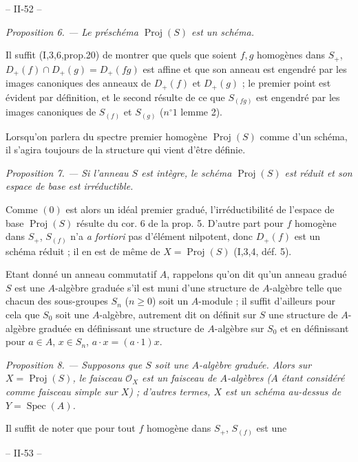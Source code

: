 \noindent -- II-52 --

\noindent \emph{Proposition 6. --- Le préschéma $\operatorname{Proj}(S)$ est un schéma.}

\noindent Il suffit (I,3,6,prop.20) de montrer que quels que soient $f,g$ homogènes dans $S_+$, $D_+(f) \cap D_+(g) = D_+(fg)$ est affine et que son anneau est engendré par les images canoniques des anneaux de $D_+(f)$ et $D_+(g)$ ; le premier point est évident par définition, et le second résulte de ce que $S_{(fg)}$ est engendré par les images canoniques de $S_{(f)}$ et $S_{(g)}$ ($n^\circ 1$ lemme 2).

\noindent Lorsqu'on parlera du spectre premier homogène $\operatorname{Proj}(S)$ comme d'un schéma, il s'agira toujours de la structure qui vient d'être définie.

\noindent \emph{Proposition 7. --- Si l'anneau $S$ est intègre, le schéma $\operatorname{Proj}(S)$ est réduit et son espace de base est irréductible.}

\noindent Comme $(0)$ est alors un idéal premier gradué, l'irréductibilité de l'espace de base $\operatorname{Proj}(S)$ résulte du cor. 6 de la prop. 5. D'autre part pour $f$ homogène dans $S_+$, $S_{(f)}$ n'a \emph{a fortiori} pas d'élément nilpotent, donc $D_+(f)$ est un schéma réduit ; il en est de même de $X = \operatorname{Proj}(S)$ (I,3,4, déf. 5).

\noindent Etant donné un anneau commutatif $A$, rappelons qu'on dit qu'un anneau gradué $S$ est une $A$-algèbre graduée s'il est muni d'une structure de $A$-algèbre telle que chacun des sous-groupes $S_n$ ($n \ge 0$) soit un $A$-module ; il suffit d'ailleurs pour cela que $S_0$ soit une $A$-algèbre, autrement dit on définit sur $S$ une structure de $A$-algèbre graduée en définissant une structure de $A$-algèbre sur $S_0$ et en définissant pour $a \in A$, $x \in S_n$, $a \cdot x = (a \cdot 1) x$.

\noindent \emph{Proposition 8. --- Supposons que $S$ soit une $A$-algèbre graduée. Alors sur $X = \operatorname{Proj}(S)$, le faisceau $\mathcal{O}_X$ est un faisceau de $A$-algèbres ($A$ étant considéré comme faisceau simple sur $X$) ; d'autres termes, $X$ est un schéma au-dessus de $Y = \operatorname{Spec}(A)$.}

\noindent Il suffit de noter que pour tout $f$ homogène dans $S_+$, $S_{(f)}$ est une

\newpage


-- II-53 --

